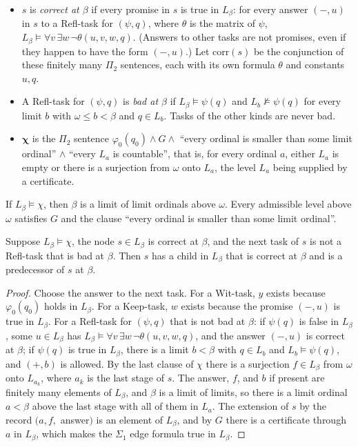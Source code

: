 \documentclass[11pt]{article}
\begin{document}
\begin{itemize}
\item $s$ is \emph{correct at $\beta$} if every promise in $s$ is true in $L_{\beta}$: for every answer $(-, u)$ in
  $s$ to a Refl-task for $(\psi, q)$, where $\theta$ is the matrix of $\psi$,
  $L_{\beta} \models \forall v\, \exists w\, \neg\theta(u, v, w, q)$. (Answers to other tasks are not promises, even
  if they happen to have the form $(-, u)$.) Let $\mathrm{corr}(s)$ be the conjunction of these
  finitely many $\Pi_2$ sentences, each with its own formula $\theta$ and constants $u, q$.
\item A Refl-task for $(\psi, q)$ is \emph{bad at $\beta$} if $L_{\beta} \models \psi(q)$ and $L_b \nvDash \psi(q)$ for
  every limit $b$ with $\omega \le b < \beta$ and $q \in L_b$. Tasks of the other kinds are never bad.
\item $\boldsymbol{\chi}$ is the $\Pi_2$ sentence $\varphi_0(q_0) \wedge G \wedge$ ``every ordinal is smaller than some
  limit ordinal'' $\wedge$ ``every $L_a$ is countable'', that is, for every ordinal $a$, either $L_a$ is empty or
  there is a surjection from $\omega$ onto $L_a$, the level $L_a$ being supplied by a certificate.
\end{itemize}

If $L_{\beta} \models \chi$, then $\beta$ is a limit of limit ordinals above $\omega$. Every admissible level above
$\omega$ satisfies $G$ and the clause ``every ordinal is smaller than some limit ordinal''.

\begin{statement} Suppose $L_{\beta} \models \chi$, the node $s \in L_{\beta}$ is correct at $\beta$,
and the next task of $s$ is not a Refl-task that is bad at $\beta$. Then $s$ has a child in $L_{\beta}$ that is correct
at $\beta$ and is a predecessor of $s$ at $\beta$.
\end{statement}

\begin{proof}
Choose the answer to the next task. For a Wit-task, $y$ exists because $\varphi_0(q_0)$ holds in $L_{\beta}$. For a
Keep-task, $w$ exists because the promise $(-, u)$ is true in $L_{\beta}$. For a Refl-task for $(\psi, q)$ that is not
bad at $\beta$: if $\psi(q)$ is false in $L_{\beta}$, some $u \in L_{\beta}$ has
$L_{\beta} \models \forall v\, \exists w\, \neg\theta(u, v, w, q)$, and the answer $(-, u)$ is correct at $\beta$; if
$\psi(q)$ is true in $L_{\beta}$, there is a limit $b < \beta$ with $q \in L_b$ and $L_b \models \psi(q)$, and
$(+, b)$ is allowed. By the last clause of $\chi$ there is a surjection $f \in L_{\beta}$ from $\omega$ onto $L_{a_k}$, where $a_k$ is the last stage of $s$.
The answer, $f$, and $b$ if present are finitely many elements of $L_{\beta}$, and $\beta$ is a limit of limits, so
there is a limit ordinal $a < \beta$ above the last stage with all of them in $L_a$. The extension of $s$ by the
record $(a, f,$ answer$)$ is an element of $L_{\beta}$, and by $G$ there is a certificate through $a$ in $L_{\beta}$,
which makes the $\Sigma_1$ edge formula true in $L_{\beta}$.
\end{proof}
\end{document}

